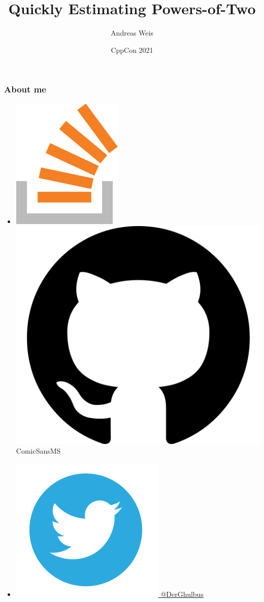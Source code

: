 \documentclass[aspectratio=43]{beamer}
\title{Quickly Estimating Powers-of-Two}
\author{Andreas Weis}
\institute{Woven Planet}
\date{CppCon 2021}
\begin{document}
\frame{\titlepage}

\begin{frame}[fragile]
  \frametitle{About me}

  \begin{itemize}
    \setlength\itemsep{1.5em}

    \item \href{https://stackoverflow.com/users/577603/comicsansms}{\includegraphics[height=.05\textheight]{resources/so-icon.png}} \href{https://github.com/ComicSansMS}{\includegraphics[height=.05\textheight]{resources/github-icon.png}} ComicSansMS

    \item \href{https://twitter.com/DerGhulbus/}{\includegraphics[height=.05\textheight]{resources/twitter-icon.png} @DerGhulbus}


\end{itemize}
\end{frame}
\end{document}

